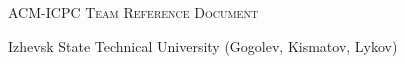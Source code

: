 \documentclass[a4paper]{article}
\begin{document}
\thispagestyle{fancy}

\begin{center}
	\Huge\textsc{ACM-ICPC Team Reference Document}

	\huge Izhevsk State Technical University (Gogolev, Kismatov, Lykov)

	\vspace{0.50cm}
\end{center}

\begin{multicols*}{2}
    \tableofcontents

    \setcounter{page}{1}
    
\end{multicols*}



%
%	
\end{document}
